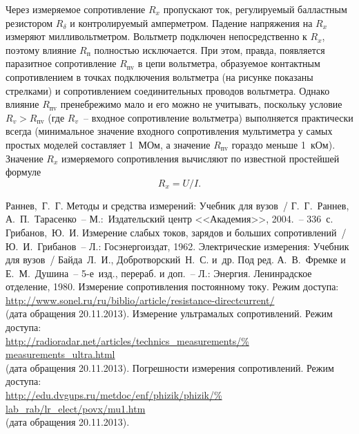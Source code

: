 \documentclass[pscyr,titlepage]{hedreport}
\begin{document}
  Через измеряемое сопротивление \( R_x \) пропускают ток, регулируемый
  балластным резистором \( R_\delta \) и контролируемый амперметром. Падение
  напряжения на \( R_x \) измеряют милливольтметром. Вольтметр подключен
  непосредственно к \( R_x \), поэтому влияние \( R_\text{п} \) полностью
  исключается. При этом, правда, появляется паразитное сопротивление
  \( R_\text{пv} \) в цепи вольтметра, образуемое контактным сопротивлением в
  точках подключения вольтметра (на рисунке показаны стрелками) и сопротивлением
  соединительных проводов вольтметра. Однако влияние \( R_\text{пv} \)
  пренебрежимо мало и его можно не учитывать, поскольку условие
  \( R_v > R_\text{пv} \) (где \( R_v \)~-- входное сопротивление вольтметра)
  выполняется практически всегда (минимальное значение входного сопротивления
  мультиметра у самых простых моделей составляет 1~МОм, а значение
  \( R_\text{пv} \) гораздо меньше 1~кОм). Значение \( R_x \) измеряемого
  сопротивления вычисляют по известной простейшей формуле
  \[
    R_x = U / I.
  \]

  \pagebreak

  \begin{thebibliography}{9}
     Раннев,~Г.~Г. Методы и средства измерений: Учебник для вузов~/
      Г.~Г.~Раннев, А.~П.~Тарасенко~-- М.:~Издательский центр <<Академия>>,
      2004.~-- 336~с.
     Грибанов,~Ю.~И. Измерение слабых токов, зарядов и больших
      сопротивлений~/ Ю.~И.~Грибанов~-- Л.: Госэнергоиздат, 1962.
     Электрические измерения: Учебник для вузов~/ Байда~Л.~И.,
      Добротворский~Н.~С. и~др. Под ред. А.~В.~Фремке и Е.~М.~Душина~--
      5-е~изд., перераб. и доп.~-- Л.: Энергия. Ленинрадское отделение, 1980.
     Измерение сопротивления постоянному току. Режим доступа:\\
      \url{http://www.sonel.ru/ru/biblio/article/resistance-directcurrent/}\\
      (дата обращения 20.11.2013).
     Измерение ультрамалых сопротивлений. Режим доступа:\\
      \url{http://radioradar.net/articles/technics_measurements/%
      measurements_ultra.html}\\
      (дата обращения 20.11.2013).
     Погрешности измерения сопротивлений. Режим доступа:\\
      \url{http://edu.dvgups.ru/metdoc/enf/phizik/phizik/%
      lab_rab/lr_elect/povx/mu1.htm}\\
      (дата обращения 20.11.2013).
  \end{thebibliography}
\end{document}
